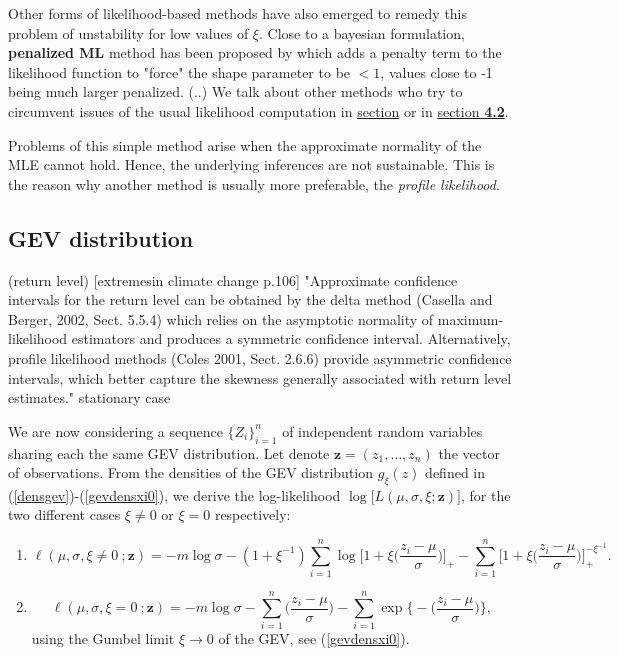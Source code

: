 \documentclass[11pt,a4paper,openany ]{book}
\begin{document}
Other forms of likelihood-based methods have also emerged to remedy this problem of unstability for low values of $\xi$. Close to a bayesian formulation, \textbf{ penalized ML} method has been proposed by \citet{coles_likelihood-based_1999} which adds a penalty term to the likelihood function to "force" the shape parameter to be $<1$, %
values close to -1 being much larger penalized. (..) We talk about other methods who try to circumvent issues of the usual likelihood computation in \hyperref[pwmm]{section} or in \hyperref[improvinf]{section\textbf{ 4.2}}.

Problems of this simple method arise when the approximate normality of the MLE cannot hold. Hence, the underlying inferences are not sustainable. This is the reason why another method is usually more preferable, the \emph{profile likelihood}.



\subsection*{GEV distribution}

(return level) [extremesin climate change p.106] "Approximate confidence intervals for the return level can be obtained by the
delta method (Casella and Berger, 2002, Sect. 5.5.4) which relies on the asymptotic
normality of maximum-likelihood estimators and produces a symmetric confidence
interval. Alternatively, profile likelihood methods (Coles 2001, Sect. 2.6.6) provide
asymmetric confidence intervals, which better capture the skewness generally
associated with return level estimates." stationary case

We are now considering a sequence $\{Z_i\}_{i=1}^n$ of independent random variables sharing 
each the same GEV distribution. Let denote $\boldsymbol{z}=(z_1,\dots,z_n)$ the vector of 
observations.
From the densities of the GEV distribution $g_{\xi}(z)$ defined in 
(\ref{densgev})-(\ref{gevdensxi0}), we derive the log-likelihood 
$\log\big[L(\mu,\sigma,\xi;\boldsymbol{z})\big]$, for the two different cases $\xi\neq 0$ 
or $\xi=0$ respectively:


\begin{enumerate}
	\item \begin{equation} \label{llik12}
	\ell(\mu,\sigma,\xi\neq 0\ ;\textbf{z})= 
	-m\log\sigma-(1+\xi^{-1})\sum_{i=1}^n\log\bigg[1+\xi\bigg(\frac{z_i-\mu}{\sigma}\bigg)\bigg]_+-\sum_{i=1}^n\bigg[1+\xi\bigg(\frac{z_i-\mu}{\sigma}\bigg)\bigg]_+^{-\xi^{-1}}.
	\end{equation}
	
	
	
	\item \begin{equation} \label{llik0}
	\ell(\mu,\sigma,\xi=0\ ;\textbf{z})=-m\log 
	\sigma-\sum_{i=1}^n\bigg(\frac{z_i-\mu}{\sigma}\bigg)-\sum_{i=1}^{n}\exp\bigg\{-\bigg(\frac{z_i-\mu}{\sigma}\bigg)\bigg\},
	\end{equation}
	using the Gumbel limit $\xi\rightarrow 0$ of the GEV, see (\ref{gevdensxi0}).
\end{enumerate}
\end{document}
